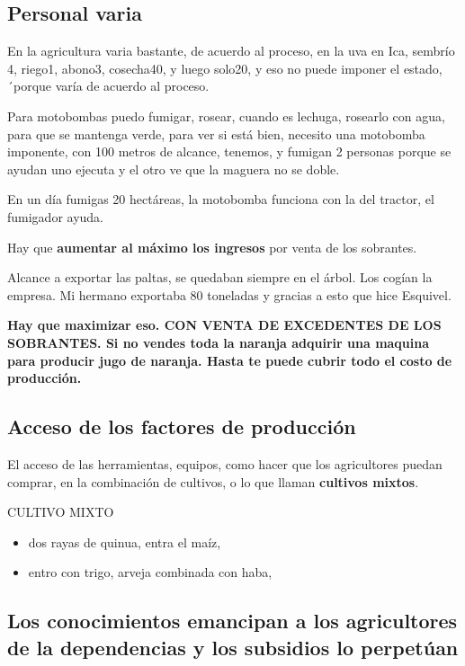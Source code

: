 \documentclass[
  a4paper,
]{article}
\begin{document}
\hypertarget{personal-varia}{%
\subsection{Personal varia}\label{personal-varia}}

En la agricultura varia bastante, de acuerdo al proceso, en la uva en
Ica, sembrío 4, riego1, abono3, cosecha40, y luego solo20, y eso no
puede imponer el estado, ´porque varía de acuerdo al proceso.

Para motobombas puedo fumigar, rosear, cuando es lechuga, rosearlo con
agua, para que se mantenga verde, para ver si está bien, necesito una
motobomba imponente, con 100 metros de alcance, tenemos, y fumigan 2
personas porque se ayudan uno ejecuta y el otro ve que la maguera no se
doble.

En un día fumigas 20 hectáreas, la motobomba funciona con la del
tractor, el fumigador ayuda.

Hay que \textbf{aumentar al máximo los ingresos} por venta de los
sobrantes.

Alcance a exportar las paltas, se quedaban siempre en el árbol. Los
cogían la empresa. Mi hermano exportaba 80 toneladas y gracias a esto
que hice Esquivel.

\textbf{Hay que maximizar eso. CON VENTA DE EXCEDENTES DE LOS SOBRANTES.
Si no vendes toda la naranja adquirir una maquina para producir jugo de
naranja. Hasta te puede cubrir todo el costo de producción.}

\hypertarget{acceso-de-los-factores-de-producciuxf3n}{%
\subsection{Acceso de los factores de
producción}\label{acceso-de-los-factores-de-producciuxf3n}}

El acceso de las herramientas, equipos, como hacer que los agricultores
puedan comprar, en la combinación de cultivos, o lo que llaman
\textbf{cultivos mixtos}.

CULTIVO MIXTO

\begin{itemize}
\item
  dos rayas de quinua, entra el maíz,
\item
  entro con trigo, arveja combinada con haba,
\end{itemize}

\hypertarget{los-conocimientos-emancipan-a-los-agricultores-de-la-dependencias-y-los-subsidios-lo-perpetuxfaan}{%
\subsection{Los conocimientos emancipan a los agricultores de la
dependencias y los subsidios lo
perpetúan}\label{los-conocimientos-emancipan-a-los-agricultores-de-la-dependencias-y-los-subsidios-lo-perpetuxfaan}}
\end{document}
